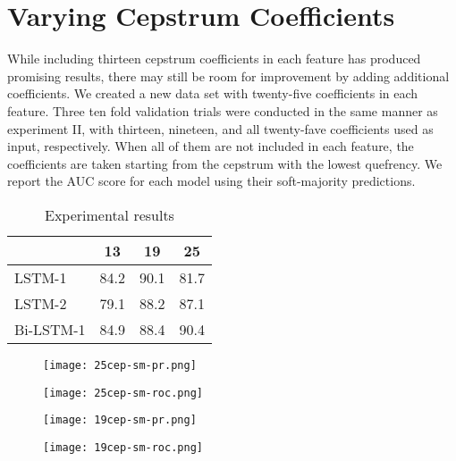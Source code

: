 \section{Varying Cepstrum Coefficients}
While including thirteen cepstrum coefficients in each feature has produced promising results, there may still be room for improvement by adding additional coefficients. We created a new data set with twenty-five coefficients in each feature. Three ten fold validation trials were conducted in the same manner as experiment II, with thirteen, nineteen, and all twenty-fave coefficients used as input, respectively. When all of them are not included in each feature, the coefficients are taken starting from the cepstrum with the lowest quefrency. We report the AUC score for each model using their soft-majority predictions.

\begin{table}[h]
\centering
\caption{Experimental results}
\begin{tabular}{|l|c|c|c|}
\hline
\multicolumn{1}{|c|}{}      &   13         &   19         &     25           \\ \hline
LSTM-1                      &   84.2     &   90.1     &     81.7       \\ \hline
LSTM-2                      &   79.1     &   88.2     &     87.1       \\ \hline
Bi-LSTM-1                   &   84.9     &   88.4     &     90.4       \\ \hline
\end{tabular}
\label{tab-results}
\end{table}

\begin{figure*}[t]
    \centering
    \begin{subfigure}[b]{0.4\textwidth}
        \texttt{[image: 25cep-sm-pr.png]}
        \caption{}
        \label{rfidtest_xaxis}
    \end{subfigure}
    \begin{subfigure}[b]{0.4\textwidth}
        \texttt{[image: 25cep-sm-roc.png]}
        \caption{}
        \label{rfidtest_yaxis}
    \end{subfigure}
    \begin{subfigure}[b]{0.4\textwidth}
        \texttt{[image: 19cep-sm-pr.png]}
        \caption{}
        \label{rfidtest_zaxis}
    \end{subfigure}
    \begin{subfigure}[b]{0.4\textwidth}
        \texttt{[image: 19cep-sm-roc.png]}
        \caption{}
        \label{rfidtest_zaxis}
    \end{subfigure}
    \caption[]{}
    \label{rfidtag_testing}
\end{figure*}

